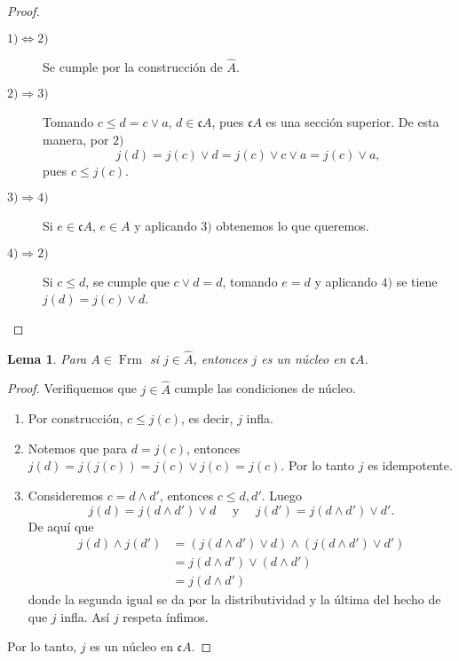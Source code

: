 \documentclass[11pt]{amsart}
\DeclareMathOperator{\Frm}{Frm}
\theoremstyle{plain}
\newtheorem{lem}[thm]{Lema}
\theoremstyle{definition}
\begin{document}
\begin{proof}
    \begin{description}
        \item[$1)\Leftrightarrow 2)$] Se cumple por la construcción de $\hat{A}$.
        \item[$2)\Rightarrow 3)$] Tomando $c\leq d=c\vee a$, $d\in \mathfrak{c}A$, pues $\mathfrak{c}A$ es una sección superior. De esta manera, por $2)$
        \[
        j(d)=j(c)\vee d=j(c)\vee c\vee a=j(c)\vee a,
        \]
        pues $c\leq j(c)$.
        \item[$3)\Rightarrow 4)$] Si $e\in \mathfrak{c}A$, $e\in A$ y aplicando $3)$ obtenemos lo que queremos.
        \item[$4)\Rightarrow 2)$] Si $c\leq d$, se cumple que $c\vee d=d$, tomando $e=d$ y aplicando $4)$ se tiene $j(d)=j(c)\vee d$. 
    \end{description}
\end{proof}

\begin{lem}\label{Lema3.3}
    Para $A\in \Frm$ si $j\in \hat{A}$, entonces $j$ es un núcleo en $\mathfrak{c}A$.
\end{lem}

\begin{proof}
    Verifiquemos que $j\in \hat{A}$ cumple las condiciones de núcleo.
    \begin{enumerate}
        \item Por construcción, $c\leq j(c)$, es decir, $j$ infla.
        \item Notemos que para $d=j(c)$, entonces $j(d)=j(j(c))=j(c)\vee j(c)=j(c)$. Por lo tanto $j$ es idempotente.
        \item Consideremos $c=d\wedge d'$, entonces $c\leq d, d'$. Luego
        \[
        j(d)=j(d\wedge d')\vee d\quad \mbox{ y }\quad j(d')=j(d\wedge d')\vee d'.
        \]
        De aquí que 
        \[
        \begin{split}
            j(d)\wedge j(d')& =(j(d\wedge d')\vee d)\wedge (j(d\wedge d')\vee d')\\
            & =j(d\wedge d')\vee (d\wedge d')\\
            &=j(d\wedge d')
        \end{split}
        \]
        donde la segunda igual se da por la distributividad y la última del hecho de que $j$ infla. Así $j$ respeta ínfimos.
    \end{enumerate}
    Por lo tanto, $j$ es un núcleo en $\mathfrak{c}A$.
\end{proof}
\end{document}
